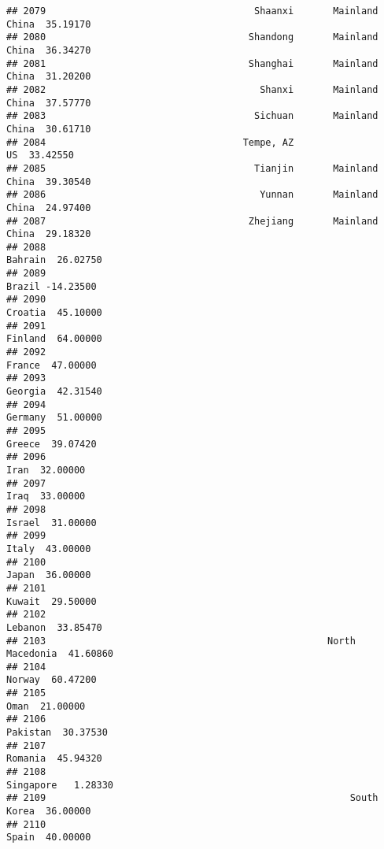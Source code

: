 \documentclass[
]{article}
\begin{document}
\begin{verbatim}
## 2079                                     Shaanxi       Mainland China  35.19170
## 2080                                    Shandong       Mainland China  36.34270
## 2081                                    Shanghai       Mainland China  31.20200
## 2082                                      Shanxi       Mainland China  37.57770
## 2083                                     Sichuan       Mainland China  30.61710
## 2084                                   Tempe, AZ                   US  33.42550
## 2085                                     Tianjin       Mainland China  39.30540
## 2086                                      Yunnan       Mainland China  24.97400
## 2087                                    Zhejiang       Mainland China  29.18320
## 2088                                                          Bahrain  26.02750
## 2089                                                           Brazil -14.23500
## 2090                                                          Croatia  45.10000
## 2091                                                          Finland  64.00000
## 2092                                                           France  47.00000
## 2093                                                          Georgia  42.31540
## 2094                                                          Germany  51.00000
## 2095                                                           Greece  39.07420
## 2096                                                             Iran  32.00000
## 2097                                                             Iraq  33.00000
## 2098                                                           Israel  31.00000
## 2099                                                            Italy  43.00000
## 2100                                                            Japan  36.00000
## 2101                                                           Kuwait  29.50000
## 2102                                                          Lebanon  33.85470
## 2103                                                  North Macedonia  41.60860
## 2104                                                           Norway  60.47200
## 2105                                                             Oman  21.00000
## 2106                                                         Pakistan  30.37530
## 2107                                                          Romania  45.94320
## 2108                                                        Singapore   1.28330
## 2109                                                      South Korea  36.00000
## 2110                                                            Spain  40.00000

\end{verbatim}
\end{document}
